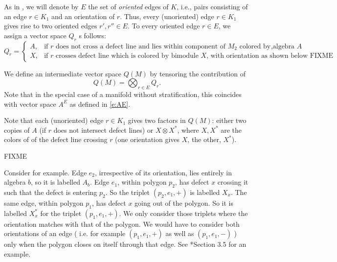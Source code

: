 \begin{defectfiguresetup}
As in , we will denote by $E$ the set of \emph{oriented}
edges of $K$, i.e., pairs consisting of an edge $r\in K_1$ and an orientation
of $r$. Thus, every (unoriented) edge $r\in K_1$ gives rise to two oriented
edges $r', r''\in E$. To every oriented edge $r\in E$, we assign a vector space
$Q_r$ s follows:
\begin{equation}\label{e:q-definition}
	Q_{r} =
	\begin{cases}
		A, & \text{if $r$ does not cross a defect line and lies within component of
		$M_2$ colored by algebra $A$ },\\
		X, & \text{if $r$ crosses defect line which is colored by bimodule $X$,
    with orientation as shown below FIXME}
	\end{cases}
	\end{equation}

We define an intermediate vector space $Q(M)$ by tensoring the contribution of
\begin{equation}\label{e:Qr}
	Q(M) = \bigotimes_{r\in E} Q_r.
\end{equation}
Note that in the special case of a manifold without stratification, this
coincides with vector space $A^E$ as defined in \eqref{e:AE}.

Note that each (unoriented) edge $r\in K_1$ gives two factors in $Q(M)$: either
two copies of $A$ (if $r$ does not intersect defect lines) or $X\otimes X^*$,
where $X, X^*$ are the colors of of the defect line crossing $r$ (one
orientation gives $X$, the other, $X^*$).


FIXME

Consider   for example. Edge $e_2$, irrespective of
its orientation, lies entirely in algebra $b$, so it is labelled $A_b$. Edge
$e_1$, within polygon $p_2$, has defect $x$ crossing it such that the defect is
entering $p_2$.  So the triplet $(p_2,e_1,+)$ is labelled $X_x$. The same edge,
within polygon $p_1$, has defect $x$ going out of the polygon. So it is
labelled $X_x^*$ for the triplet $(p_1,e_1,+)$.  We only consider those
triplets where the orientation matches with that of the polygon. We would have
to consider both orientations of an edge ( i.e. for example $(p_1,e_1,+)$ as
well as $(p_1,e_1,-)$ ) only when the polygon closes on itself through that
edge. See *{Section 3.5} for an example.


\end{defectfiguresetup}
